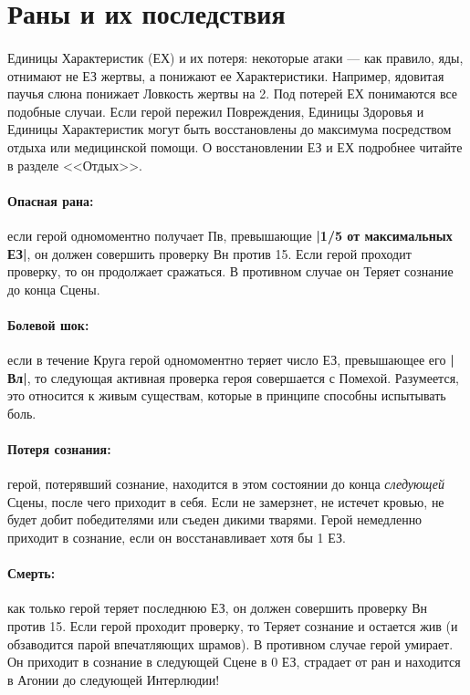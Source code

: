 \section{Раны и их последствия}
\paragraph{}
Единицы Характеристик (ЕХ) и их потеря: некоторые атаки — как правило, яды, отнимают не ЕЗ жертвы, а понижают ее Характеристики. Например, ядовитая паучья слюна понижает Ловкость жертвы на 2. Под потерей ЕХ понимаются все подобные случаи.
\newline
Если герой пережил Повреждения, Единицы Здоровья и Единицы Характеристик могут быть восстановлены до максимума посредством отдыха или медицинской помощи. О восстановлении ЕЗ и ЕХ подробнее читайте в разделе <<Отдых>>.
\paragraph{Опасная рана:} если герой одномоментно получает Пв, превышающие \textbf{|1/5 от максимальных ЕЗ|}, он должен совершить проверку Вн против 15. Если герой проходит проверку, то он продолжает сражаться. В противном случае он Теряет сознание до конца Сцены.
\paragraph{Болевой шок:} если в течение Круга герой одномоментно теряет число ЕЗ, превышающее его \textbf{|Вл|}, то следующая активная проверка героя совершается с Помехой. Разумеется, это относится к живым существам, которые в принципе способны испытывать боль.
\paragraph{Потеря сознания:} герой, потерявший сознание, находится в этом состоянии до конца \textit{следующей} Сцены, после чего приходит в себя. Если не замерзнет, не истечет кровью, не будет добит победителями или съеден дикими тварями.
\newline
Герой немедленно приходит в сознание, если он восстанавливает хотя бы 1 ЕЗ.
\paragraph{Смерть:} как только герой теряет последнюю ЕЗ, он должен совершить проверку Вн против 15. Если герой проходит проверку, то Теряет сознание и остается жив (и обзаводится парой впечатляющих шрамов). В противном случае герой умирает. Он приходит в сознание в следующей Сцене в 0 ЕЗ, страдает от ран и находится в Агонии до следующей Интерлюдии!
